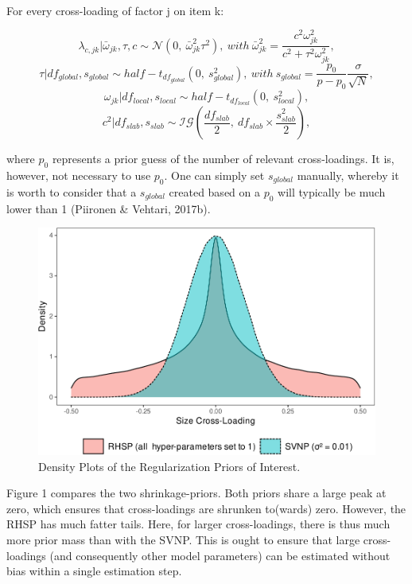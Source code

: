 \documentclass[
  man,floatsintext]{apa6}
\begin{document}
~

For every cross-loading of factor j on item k:

\[\lambda_{c,jk} | \bar{\omega}_{jk}, \tau, c\sim \mathcal{N}(0, \ \bar{\omega}^2_{jk} \tau^2), \ with \ \bar{\omega}^2_{jk} = \frac{c^2\omega_{jk}^2}{c^2 + \tau^2 \omega_{jk}^2},\]
\[\tau | df_{global}, s_{global} \sim half-t_{df_{global}}(0,\  s_{global}^2), \ with \  s_{global} = \frac{p_0}{p-p_0}\frac{\sigma}{\sqrt{N}},\]
\[\omega_{jk}| df_{local}, s_{local} \sim half-t_{df_{local}}(0, \ s_{local}^2),\]
\[c^2 | df_{slab}, s_{slab} \sim \mathcal{IG}(\frac{df_{slab}}{2}, \  df_{slab} \times \frac{s_{slab}^2}{2}),\]

where \(p_0\) represents a prior guess of the number of relevant cross-loadings. It is, however, not necessary to use \(p_0\). One can simply set \(s_{global}\) manually, whereby it is worth to consider that a \(s_{global}\) created based on a \(p_0\) will typically be much lower than 1 (Piironen \& Vehtari, 2017b).

\begin{figure}
\centering
\includegraphics{JMBKoch_report_files/figure-latex/unnamed-chunk-1-1.pdf}
\caption{\label{fig:unnamed-chunk-1}Density Plots of the Regularization Priors of Interest.}
\end{figure}

Figure 1 compares the two shrinkage-priors. Both priors share a large peak at zero, which ensures that cross-loadings are shrunken to(wards) zero. However, the RHSP has much fatter tails. Here, for larger cross-loadings, there is thus much more prior mass than with the SVNP. This is ought to ensure that large cross-loadings (and consequently other model parameters) can be estimated without bias within a single estimation step.
\end{document}
